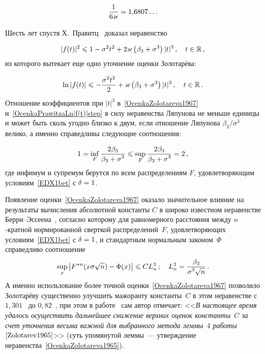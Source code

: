 \begin{multicols}{2}
\noindent
$$
\displaystyle\frac{\displaystyle 1\mathstrut}{\displaystyle 6\varkappa\mathstrut}=1{,}6807\ldots
$$

Шесть лет спустя Х.~Правитц~\cite{Prawitz1973} доказал неравенство

\noindent
\begin{equation}
\label{OcenkaPrawitza|f(t)|^2step}
|f(t)|^2\leqslant1 -\sigma^2t^2+
2\varkappa\left(\beta_3+\sigma^3\right)|t|^3\,,\quad t\in\mathbb R\,,
\end{equation}
из которого вытекает еще одно уточнение оценки Золотарёва:

\noindent
\begin{equation}
\label{OcenkaPrawitzaLn|f(t)|step}
\ln|f(t)|\leqslant -\displaystyle\frac{\displaystyle \sigma^2t^2\mathstrut}{\displaystyle 2\mathstrut}+
\varkappa\left(\beta_3+\sigma^3\right)|t|^3\,,\quad t\in\mathbb R\,.
\end{equation}
Отношение коэффициентов при $|t|^3$ в~\eqref{OcenkaZolotareva1967}
и~\eqref{OcenkaPrawitzaLn|f(t)|step} в силу неравенства Ляпунова не
меньше единицы и может быть сколь угодно близко к двум, если
отношение Ляпунова $\beta_3/\sigma^3$ велико, а именно справедливы
следующие соотношения:

\noindent
$$
1=\inf_{F}\displaystyle\frac{\displaystyle 2\beta_3\mathstrut}{\displaystyle \beta_3+\sigma^3\mathstrut}\leqslant \sup\limits_{F}\displaystyle\frac{\displaystyle 2\beta_3\mathstrut}{\displaystyle \beta_3+\sigma^3\mathstrut}=2\,,
$$
где инфимум и супремум берутся по всем распределениям $F$,
удовлетворяющим условиям~\eqref{EDX1bet} с $\delta=1$.

Появление оценки~\eqref{OcenkaZolotareva1967} оказало значительное
влияние на результаты вычисления абсолютной константы $C$ в широко
известном неравенстве Берри--Эссеена~\cite{Berry1941, Esseen1942},
согласно которому для равномерного расстояния между $n$-кратной
норми\-рованной сверткой распределений~$F$, удов\-ле\-тво\-ря\-ющих
условиям~\eqref{EDX1bet} с $\delta=1$, и стандартным\linebreak
 нормальным законом~$\Phi$ справедливо соотношение
$$
\sup_x\left|F^{*n}(x\sigma\sqrt n)-\Phi(x)\right|\leqslant C
L_n^3\,;\quad L_n^3=\displaystyle\frac{\displaystyle \beta_3\mathstrut}{\displaystyle \sigma^3\sqrt{n}\mathstrut}\,.
$$
А именно использование более точной
оценки~\eqref{OcenkaZolotareva1967} позволило Золотарёву существенно
улучшить мажоранту константы~$C$ в этом неравенстве с
$1{,}301$~\cite{Zolotarev1966} до $0{,}82$~\cite{Zolotarev1967a, Zolotarev1967b},
при этом в работе~\cite{Zolotarev1967a} сам автор
отмечает: <<{\it В настоящее время удалось осуществить дальнейшее
снижение верхних оценок константы~$C$ за счет уточнения весьма
важной для выбранного метода леммы~$4$
работы}~$\cite{Zolotarev1965}$>> (суть упомянутой леммы~---
утверждение неравенства~\eqref{OcenkaZolotareva1965}).


\end{multicols}
